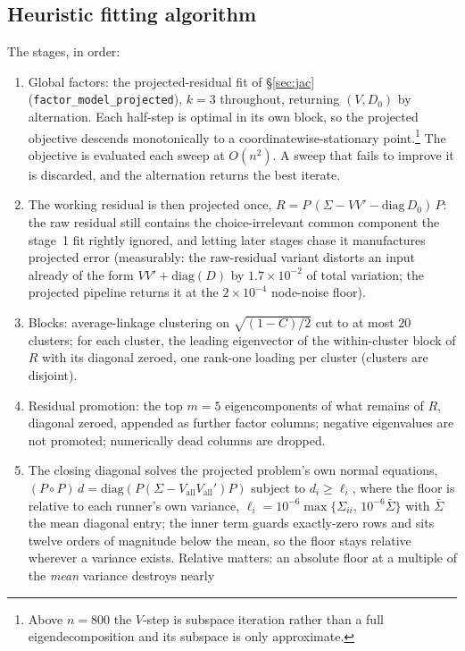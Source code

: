 \documentclass[11pt]{article}
\begin{document}
\subsection{Heuristic fitting algorithm}

The stages, in order:
\begin{enumerate}
\item Global factors: the projected-residual fit of \S\ref{sec:jac}
(\texttt{factor\_model\_projected}), $k=3$ throughout, returning $(V,D_0)$
by alternation. Each half-step is optimal in its own block, so the projected objective descends monotonically to a
coordinatewise-stationary point.\footnote{Above $n=800$ the $V$-step is subspace
iteration rather than a full eigendecomposition and its subspace is only
approximate.} The objective is
evaluated each sweep at $O(n^2)$. A sweep that fails to improve it is
discarded, and the alternation returns the best iterate.
\item The working residual is then
projected once, $R=P\,(\Sigma-VV'-\mathrm{diag}\,D_0)\,P$: the raw residual
still contains the choice-irrelevant common component the stage~1 fit
rightly ignored, and letting later stages chase it manufactures projected
error (measurably: the raw-residual variant distorts an input already of the
form $VV'+\mathrm{diag}(D)$ by $1.7\times10^{-2}$ of total variation;
the projected pipeline returns it at the $2\times10^{-4}$ node-noise
floor).
\item Blocks: average-linkage clustering on
$\sqrt{(1-C)/2}$ cut to at most $20$ clusters; for each cluster, the leading
eigenvector of the within-cluster block of $R$ with its diagonal zeroed,
one rank-one loading per cluster (clusters are disjoint).
\item Residual promotion: the top $m=5$ eigencomponents of what remains of $R$, diagonal
zeroed, appended as further factor columns; negative eigenvalues are not
promoted; numerically dead columns are dropped.
\item The closing diagonal
solves the projected problem's own normal equations,
$(P\!\circ\!P)\,d=\mathrm{diag}(P(\Sigma-V_{\mathrm{all}}V_{\mathrm{all}}')P)$
subject to $d_i\ge\ell_i$, where the floor is relative to each runner's
own variance, $\ell_i=10^{-6}\max\{\Sigma_{ii},\,10^{-6}\bar\Sigma\}$
with $\bar\Sigma$ the mean diagonal entry; the inner term guards
exactly-zero rows and sits twelve orders of magnitude below the mean,
so the floor stays relative wherever a variance exists. Relative
matters: an
absolute floor at a multiple of the \emph{mean} variance destroys nearly

\end{enumerate}
\end{document}
